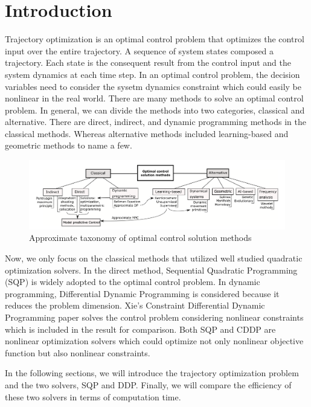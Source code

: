 \documentclass{article}
\begin{document}
\section{Introduction}
Trajectory optimization is an optimal control problem that optimizes the control input over the entire trajectory. A sequence of system states composed a trajectory. Each state is the consequent result from the control input and the system dynamics at each time step. In an optimal control problem, the decision variables need to consider the sysetm dynamics constraint which could easily be nonlinear in the real world. There are many methods to solve an optimal control problem. In general, we can divide the methods into two categories, classical and alternative. There are direct, indirect, and dynamic programming methods in the classical methods. Whereas alternative methods included learning-based and geometric methods to name a few. 
\begin{figure}[h]
    \centering
    \includegraphics[width=\textwidth]{images/Approximate-taxonomy-of-optimal-control-solution-methods.png}
    \caption{Approximate taxonomy of optimal control solution methods \cite{optimal-control-taxonomy}}
    \label{fig:optimal-control-taxonomy}
\end{figure}

Now, we only focus on the classical methods that utilized well studied quadratic optimization solvers. In the direct method, Sequential Quadratic Programming (SQP) is widely adopted to the optimal control problem. In dynamic programming, Differential Dynamic Programming is considered because it reduces the problem dimension. Xie's Constraint Differential Dynamic Programming paper solves the control problem considering nonlinear constraints \cite{CDDP} which is included in the result for comparison. Both SQP and CDDP are nonlinear optimization solvers which could optimize not only nonlinear objective function but also nonlinear constraints. 

In the following sections, we will introduce the trajectory optimization problem and the two solvers, SQP and DDP. Finally, we will compare the efficiency of these two solvers in terms of computation time. 
\end{document}

